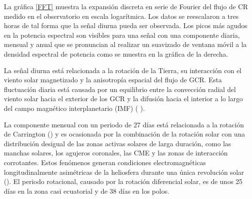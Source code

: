La gráfica \ref{FFT} muestra la expansión discreta en serie de Fourier del flujo de CR medido en el observatorio en escala logarítmica. Los datos se reescalaron a tres horas de tal forma que la señal diurna pueda ser observada. Los picos más agudos en la potencia espectral son visibles para una señal con una componente diaria, mensual y anual que se pronuncian al realizar un suavizado de ventana móvil a la densidad espectral de potencia como se muestra en la gráfica de la derecha. 

La señal diurna está relacionada a la rotación de la Tierra, su interacción con el viento solar magnetizado y la anisotropía espacial del flujo de GCR. Esta fluctuación diaria está causada por un equilibrio entre la convección radial del viento solar hacia el exterior de los GCR y la difusión hacia el interior a lo largo del campo magnético interplanetario (IMF) (\cite{martin_ICRC} \cite{noelia_2023}). 

La componente mensual con un periodo de 27 días está relacionada a la rotación de Carrington (\cite{martin_ICRC}) y es ocasionada por la combinación de la rotación solar con una distribución desigual de las zonas activas solares de larga duración, como las manchas solares, los agujeros coronales, las CME y las zonas de interacción corrotantes. Estos fenómenos generan condiciones electromagnéticas longitudinalmente asimétricas de la heliosfera durante una única revolución solar (\cite{grieder_2001}). El periodo rotacional, causado por la rotación diferencial solar, es de unos 25 días en la zona casi ecuatorial y de 38 días en los polos.

